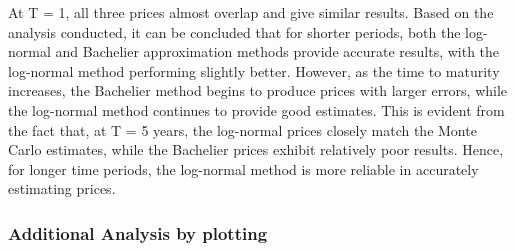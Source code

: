 \documentclass[11pt]{article}
\begin{document}
At T = 1, all three prices almost overlap and give similar results.
Based on the analysis conducted, it can be concluded that for shorter
periods, both the log-normal and Bachelier approximation methods provide
accurate results, with the log-normal method performing slightly better.
However, as the time to maturity increases, the Bachelier method begins
to produce prices with larger errors, while the log-normal method
continues to provide good estimates. This is evident from the fact that,
at T = 5 years, the log-normal prices closely match the Monte Carlo
estimates, while the Bachelier prices exhibit relatively poor results.
Hence, for longer time periods, the log-normal method is more reliable
in accurately estimating prices.

    \hypertarget{additional-analysis-by-plotting}{%
\subsubsection{Additional Analysis by
plotting}\label{additional-analysis-by-plotting}}
\end{document}
